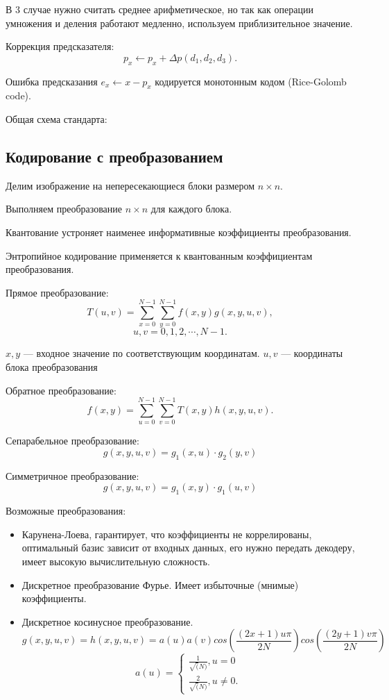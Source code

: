 {В 3 случае нужно считать среднее арифметическое, но так как операции умножения
и деления работают медленно, используем приблизительное значение.

Коррекция предсказателя:
\[
    p_x \leftarrow p_x + \Delta p(d_1, d_2, d_3).
\]

Ошибка предсказания $e_x \leftarrow x - p_x$ кодируется монотонным кодом
(Rice-Golomb code).


Общая схема стандарта:


\subsection{Кодирование с преобразованием}

Делим изображение на непересекающиеся блоки размером $n \times n$.

Выполняем преобразование $n \times n$ для каждого блока.

Квантование устроняет наименее информативные коэффициенты преобразования.

Энтропийное кодирование применяется к квантованным коэффициентам
преобразования.

Прямое преобразование:
\[
    T(u, v) = \sum_{x=0}^{N-1} \sum_{y=0}^{N-1} f(x, y) g(x, y, u, v),
\]
\[
    u, v = 0, 1, 2, \cdots, N-1.
\]

$x, y$ --- входное значение по соответствующим координатам. $u, v$ ---
координаты блока преобразования

Обратное преобразование:
\[
    f(x, y) = \sum_{u=0}^{N-1} \sum_{v=0}^{N-1} T(x, y) h(x, y, u, v).
\]

Сепарабельное преобразование:
\[
    g(x, y, u, v) = g_1(x, u) \cdot g_2(y, v)
\]

Симметричное преобразование:
\[
    g(x, y, u, v) = g_1(x, y) \cdot g_1(u, v)
\]

Возможные преобразования:
\begin{itemize}
    \item Карунена-Лоева, гарантирует, что коэффициенты не коррелированы,
        оптимальный базис зависит от входных данных, его нужно передать
        декодеру, имеет высокую вычислительную сложность.

    \item Дискретное преобразование Фурье. Имеет избыточные (мнимые)
        коэффициенты.

    \item Дискретное косинусное преобразование.
        \[
            g(x, y, u, v) = h(x, y, u, v) = a(u) a(v) cos \left( \frac{(2x +
            1)u\pi}{ 2N} \right) cos \left( \frac{(2y + 1)v\pi}{2N} \right)
        \]
        \[
            a(u) = 
            \begin{cases}
                \frac{1}{\sqrt(N)}, u = 0\\
                \frac{2}{\sqrt(N)}, u \neq 0.
            \end{cases}

\]
\end{itemize}}
